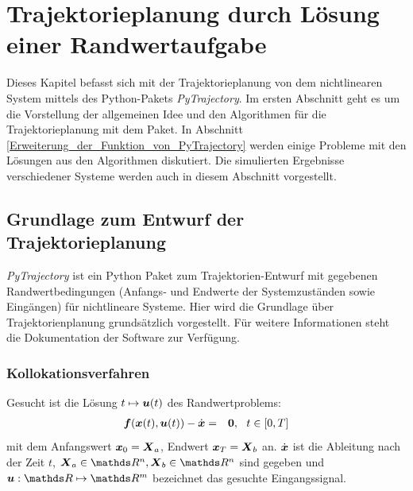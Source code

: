 \ifpdf
\graphicspath{{bild/}}
\else
\graphicspath{%
	{bild/}}
\fi


\chapter{Trajektorieplanung durch Lösung einer Randwertaufgabe}
\label{ch:Trajektorieplanung_durch_Lösung_einer_Randwertaufgabe}

Dieses Kapitel befasst sich mit der Trajektorieplanung von dem nichtlinearen System mittels des Python-Pakets \emph{PyTrajectory}. Im ersten Abschnitt geht es um die Vorstellung der allgemeinen Idee und den Algorithmen für die Trajektorieplanung mit dem Paket. In Abschnitt \ref{Erweiterung_der_Funktion_von_PyTrajectory} werden einige Probleme mit den Lösungen aus den Algorithmen diskutiert. Die simulierten Ergebnisse verschiedener Systeme werden auch in diesem Abschnitt vorgestellt.


\section{Grundlage zum Entwurf der Trajektorieplanung}
\label{Grundlage_zum_Entwurf_der_Trajektorieplanung}
\emph{PyTrajectory} ist ein Python Paket zum Trajektorien-Entwurf mit gegebenen Randwertbedingungen (Anfangs- und Endwerte der Systemzuständen sowie Eingängen) für nichtlineare Systeme. Hier wird die Grundlage über Trajektorienplanung grundsätzlich vorgestellt. Für weitere Informationen steht die Dokumentation der Software \cite{PyTra} zur Verfügung.
\subsection{Kollokationsverfahren}
\label{Kollokationsverfahren}
Gesucht ist die Lösung $t\mapsto\boldsymbol u(t)$ des Randwertproblems:
\begin{eqnarray}
\boldsymbol f(\boldsymbol x(t), \boldsymbol u(t)) - \dot{\boldsymbol x} &=& \boldsymbol 0, ~~t\in [0,T]
\label{eq:Kollocationverfahren}
\end{eqnarray}
mit dem Anfangswert $\boldsymbol x_{0} = \boldsymbol X_{a}$, Endwert $\boldsymbol x_{T} = \boldsymbol X_{b}$ an. $\dot{\boldsymbol x}$ ist die Ableitung nach der Zeit $t$, $\vect{X}_{a}\in \Reals^{n}, \vect{X}_{b}\in \Reals^{n}$ sind gegeben und $\vect{u}: \Reals\mapsto \Reals^{m}$ bezeichnet das gesuchte Eingangssignal. 

